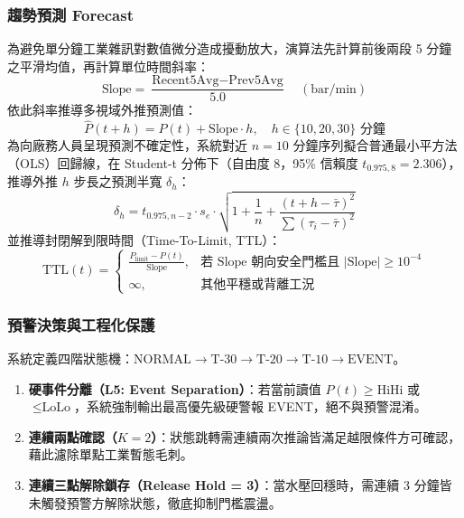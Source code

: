 \documentclass[fontset=none, a4paper, 12pt]{ctexart}
\begin{document}
\subsubsection{趨勢預測 Forecast}
為避免單分鐘工業雜訊對數值微分造成擾動放大，演算法先計算前後兩段 5 分鐘之平滑均值，再計算單位時間斜率：
\begin{equation}
\text{Slope} = \frac{\text{Recent5Avg} - \text{Prev5Avg}}{5.0} \quad (\text{bar/min})
\end{equation}
依此斜率推導多視域外推預測值：
\begin{equation}
\hat{P}(t + h) = P(t) + \text{Slope} \cdot h, \quad h \in \{10, 20, 30\} \text{ 分鐘}
\end{equation}
為向廠務人員呈現預測不確定性，系統對近 $n = 10$ 分鐘序列擬合普通最小平方法（OLS）回歸線，在 Student-t 分佈下（自由度 8，95\% 信賴度 $t_{0.975,8} = 2.306$），推導外推 $h$ 步長之預測半寬 $\delta_h$：
\begin{equation}
\delta_h = t_{0.975, n-2} \cdot s_e \cdot \sqrt{1 + \frac{1}{n} + \frac{(t + h - \bar{\tau})^2}{\sum (\tau_i - \bar{\tau})^2}}
\end{equation}
並推導封閉解到限時間（Time-To-Limit, TTL）：
\begin{equation}
\text{TTL}(t) = \begin{cases}
\frac{P_{\text{limit}} - P(t)}{\text{Slope}}, & \text{若 } \text{Slope} \text{ 朝向安全門檻且 } |\text{Slope}| \ge 10^{-4} \\
\infty, & \text{其他平穩或背離工況}
\end{cases}
\end{equation}

\subsubsection{預警決策與工程化保護}
系統定義四階狀態機：$\text{NORMAL} \to \text{T-30} \to \text{T-20} \to \text{T-10} \to \text{EVENT}$。
\begin{enumerate}
    \item \textbf{硬事件分離（L5: Event Separation）}：若當前讀值 $P(t) \ge \text{HiHi}$ 或 $\le \text{LoLo}$，系統強制輸出最高優先級硬警報 EVENT，絕不與預警混淆。
    \item \textbf{連續兩點確認（$K=2$）}：狀態跳轉需連續兩次推論皆滿足越限條件方可確認，藉此濾除單點工業暫態毛刺。
    \item \textbf{連續三點解除鎖存（Release Hold = 3）}：當水壓回穩時，需連續 3 分鐘皆未觸發預警方解除狀態，徹底抑制門檻震盪。
\end{enumerate}
\end{document}
